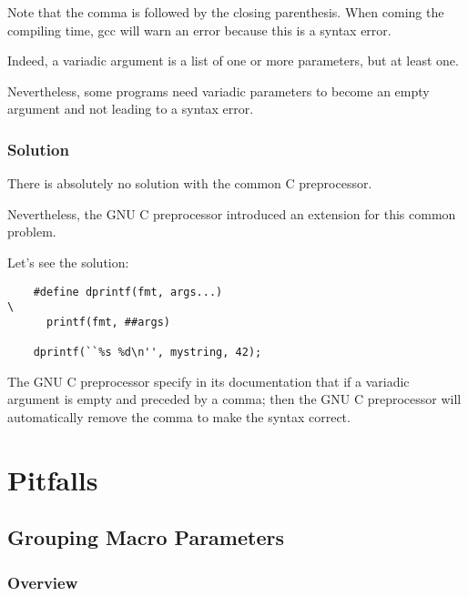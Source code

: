 {\begin{frame}[containsverbatim]
  Note that the comma is followed by the closing parenthesis. When coming
  the compiling time, gcc will warn an error because this is a syntax
  error.

  \nl

  Indeed, a variadic argument is a list of one or more parameters, but at
  least one.

  \nl

  Nevertheless, some programs need variadic parameters to become an empty
  argument and not leading to a syntax error.
\end{frame}


\begin{frame}[containsverbatim]
  \frametitle{Solution}

  There is absolutely no solution with the common C preprocessor.

  \nl

  Nevertheless, the GNU C preprocessor introduced an extension for
  this common problem.

  \nl

  Let's see the solution:

  \begin{verbatim}
    #define dprintf(fmt, args...)                                       \
      printf(fmt, ##args)

    dprintf(``%s %d\n'', mystring, 42);
  \end{verbatim}

  The GNU C preprocessor specify in its documentation that if a variadic
  argument is empty and preceded by a comma; then the GNU C preprocessor will
  automatically remove the comma to make the syntax correct.
\end{frame}

%
%

\section{Pitfalls}

%
%

\subsection{Grouping Macro Parameters}


\begin{frame}[containsverbatim]
  \frametitle{Overview}


\end{frame}}
